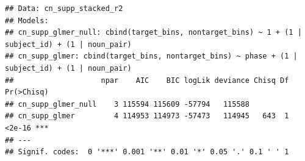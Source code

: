 \documentclass[
  doc,floatsintext]{apa6}
\newenvironment{Shaded}{\begin{snugshade}}{\end{snugshade}}
\newcommand{\DecValTok}[1]{\textcolor[rgb]{0.00,0.00,0.81}{#1}}
\newcommand{\FunctionTok}[1]{\textcolor[rgb]{0.13,0.29,0.53}{\textbf{#1}}}
\newcommand{\NormalTok}[1]{#1}
\newcommand{\OtherTok}[1]{\textcolor[rgb]{0.56,0.35,0.01}{#1}}
\newcommand{\SpecialCharTok}[1]{\textcolor[rgb]{0.81,0.36,0.00}{\textbf{#1}}}
\newcommand{\StringTok}[1]{\textcolor[rgb]{0.31,0.60,0.02}{#1}}
\begin{document}
\begin{Shaded}
\end{Shaded}

\begin{verbatim}
## Data: cn_supp_stacked_r2
## Models:
## cn_supp_glmer_null: cbind(target_bins, nontarget_bins) ~ 1 + (1 | subject_id) + (1 | noun_pair)
## cn_supp_glmer: cbind(target_bins, nontarget_bins) ~ phase + (1 | subject_id) + (1 | noun_pair)
##                    npar    AIC    BIC logLik deviance Chisq Df Pr(>Chisq)    
## cn_supp_glmer_null    3 115594 115609 -57794   115588                        
## cn_supp_glmer         4 114953 114973 -57473   114945   643  1     <2e-16 ***
## ---
## Signif. codes:  0 '***' 0.001 '**' 0.01 '*' 0.05 '.' 0.1 ' ' 1
\end{verbatim}
\end{document}
